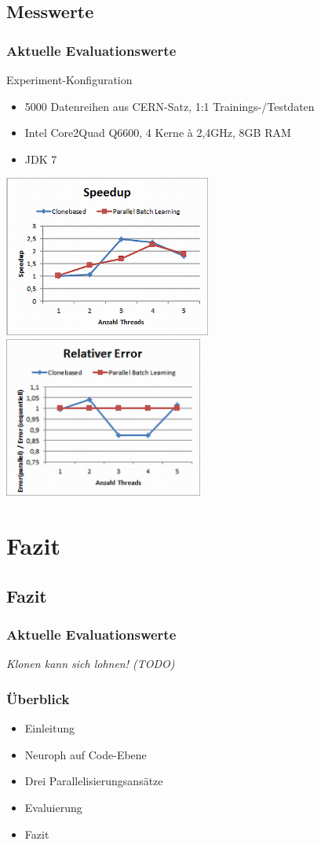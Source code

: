 \documentclass[18pt]{beamer}
\begin{document}
	
	\subsection{Messwerte}
	\begin{frame}\frametitle{Aktuelle Evaluationswerte}
		\begin{block}{Experiment-Konfiguration}
			\begin{itemize}
				\item 5000 Datenreihen aus CERN-Satz, 1:1 Trainings-/Testdaten
				\item Intel Core2Quad Q6600, 4 Kerne à 2,4GHz, 8GB RAM
				\item JDK 7
			\end{itemize}
		\end{block}
		\includegraphics[width=0.51\textwidth]{images/eval_speedup.png}
		\includegraphics[width=0.49\textwidth]{images/eval_error.png}
	\end{frame}
	\section{Fazit}
	\subsection{Fazit}
	\begin{frame}\frametitle{Aktuelle Evaluationswerte}
		\textit{Klonen kann sich lohnen! (TODO)}
	\end{frame}
	
	\begin{frame}[c]\frametitle{Überblick}
		\begin{itemize}
		   \item Einleitung \checkmark
		   \item Neuroph auf Code-Ebene \checkmark
		   \item Drei Parallelisierungsansätze \checkmark
		   \item Evaluierung \checkmark
		   \item Fazit
		\end{itemize}
	\end{frame}
\end{document}
